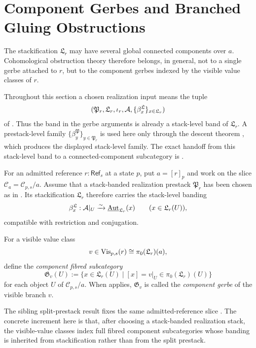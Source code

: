 ﻿\section{Component Gerbes and Branched Gluing Obstructions}\label{sec:gerbe-obstruction}

The stackification $\mathfrak L_r$ may have several global connected
components over $a$. Cohomological obstruction theory therefore belongs, in
general, not to a single gerbe attached to $r$, but to the component gerbes
indexed by the visible value classes of $r$.

Throughout this section a chosen realization input means the tuple
\[
(\mathfrak P_r,\mathfrak L_r,\iota_r,\mathcal{A},
\{\beta^{\mathfrak L}_x\}_{x\in\mathfrak L_r})
\]
of . Thus the band in the gerbe arguments is
already a stack-level band of $\mathfrak L_r$. A prestack-level family
$\{\beta^{\mathfrak P}_y\}_{y\in\mathfrak P_r}$ is used here only through the
descent theorem , which produces the
displayed stack-level family. The exact handoff from this stack-level band to a
connected-component subcategory is
.

\begin{definition}\label{def:compatible-realization-stack}
For an admitted reference $r:\mathsf{Ref}_s$ at a state $p$, put $a=[r]_p$ and
work on the slice $\mathcal C_a=\mathcal C_{p,s}/a$. Assume that a stack-banded realization prestack $\mathfrak P_r$ has been
chosen as in . Its stackification $\mathfrak L_r$
therefore carries the stack-level banding
\[
\beta^{\mathfrak L}_x:\mathcal{A}|_U\xrightarrow{\sim}
\underline{\mathrm{Aut}}_{\mathfrak L_r}(x)
\qquad (x\in\mathfrak L_r(U)),
\]
compatible with restriction and conjugation.

For a visible value class
\[
v\in \mathrm{Vis}_{p,s}(r)\cong \pi_0(\mathfrak L_r)(a),
\]
define the \emph{component fibred subcategory}
\[
\mathfrak G_v(U):=\{x\in \mathfrak L_r(U)\mid [x]=v|_U\in \pi_0(\mathfrak L_r)(U)\}
\]
for each object $U$ of $\mathcal C_{p,s}/a$. When  applies, $\mathfrak G_v$ is called the \emph{component gerbe} of the visible branch $v$.
\end{definition}

\begin{remark}
The sibling split-prestack result fixes the same admitted-reference slice
\cite[Proposition~4.34]{HomologicalVisibilityGluingObstructions2026}. The
concrete increment here is that, after choosing a stack-banded realization
stack, the visible-value classes index full fibred component subcategories whose
banding is inherited from stackification rather than from the split prestack.
\end{remark}

